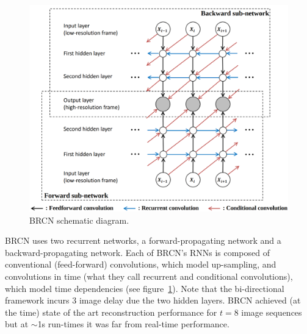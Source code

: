 \begin{figure}
    \includegraphics[width=.49\textwidth]{figures/neural_networks/brcn.png}
    \caption{BRCN schematic diagram\cite{huang2015bidirectional}.}\label{subfig:brcn}
\end{figure}
BRCN uses two recurrent networks, a forward-propagating network and a backward-propagating network.
%
Each of BRCN's RNNs is composed of conventional (feed-forward) convolutions, which model up-sampling, and convolutions in time (what they call recurrent and conditional convolutions), which model time dependencies (see figure~\ref{subfig:brcn}).
%
Note that the bi-directional framework incurs 3 image delay due the two hidden layers.
%
BRCN achieved (at the time) state of the art reconstruction performance for \(t=8\) image sequences but at \(\sim\)1s run-times it was far from real-time performance.
